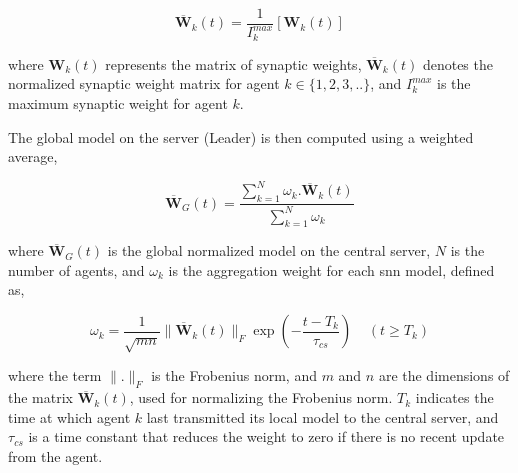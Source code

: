 \begin{equation} \label{Eq.AFL.1}
    \bm{\overline{W}}_{k}(t) = \frac{1}{I_{k}^{max}}[\bm{W}_{k}(t)]
\end{equation}

\noindent where \(\bm{W}_{k}(t)\) represents the matrix of synaptic weights, \(\bm{\overline{W}}_{k}(t)\) denotes the normalized synaptic weight matrix for agent \(k \in \{1,2,3,..\} \), and \(I_{k}^{max}\) is the maximum synaptic weight for agent \(k\). 

The global model on the server (Leader) is then computed using a weighted average,

\begin{equation} \label{Eq.AFL.2}
\bm{\overline{W}}_{G}(t) = \frac{\sum_{k=1}^{N} \omega_{k} . \bm{\overline{W}}_{k}(t)}{\sum_{k=1}^{N} \omega_{k}}
\end{equation}

\noindent where \(\bm{\overline{W}}_{G}(t)\) is the global normalized model on the central server, \(N\) is the number of agents, and \(\omega_{k}\) is the aggregation weight for each \ac{snn} model, defined as,

\begin{equation} \label{Eq.AFL.3}
\omega_{k} = \frac{1}{\sqrt{mn}} \|\bm{\overline{W}}_{k}(t)\|_F \exp\left(-\frac{t-T_{k}}{\tau_{cs}}\right)\;\;\;\; (t \geq T_{k})
\end{equation}

\noindent where the term \(\|.\|_F\) is the Frobenius norm, and \(m\) and \(n\) are the dimensions of the matrix \(\bm{\overline{W}}_{k}(t)\), used for normalizing the Frobenius norm. \(T_{k}\) indicates the time at which agent \(k\) last transmitted its local model to the central server, and \(\tau_{cs}\) is a time constant that reduces the weight to zero if there is no recent update from the agent.


